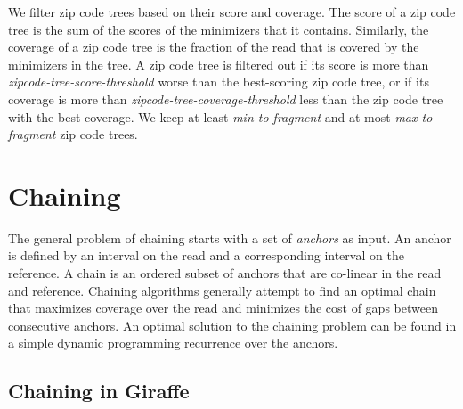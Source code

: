 \documentclass[11pt]{ucscthesis}
\begin{document}
We filter zip code trees based on their score and coverage.
The score of a zip code tree is the sum of the scores of the minimizers that it contains.
Similarly, the coverage of a zip code tree is the fraction of the read that is covered by the minimizers in the tree.
A zip code tree is filtered out if its score is more than \emph{zipcode-tree-score-threshold} worse than the best-scoring zip code tree, or if its coverage is more than \emph{zipcode-tree-coverage-threshold} less than the zip code tree with the best coverage.
We keep at least \emph{min-to-fragment} and at most \emph{max-to-fragment} zip code trees.


\section{Chaining}
\label{sec:sup-chaining}

The general problem of chaining starts with a set of \emph{anchors} as input.
An anchor is defined by an interval on the read and a corresponding interval on the reference.
A chain is an ordered subset of anchors that are co-linear in the read and reference.
Chaining algorithms generally attempt to find an optimal chain that maximizes coverage over the read and minimizes the cost of gaps between consecutive anchors.
An optimal solution to the chaining problem can be found in a simple dynamic programming recurrence over the anchors.


\subsection{Chaining in Giraffe}
\end{document}
